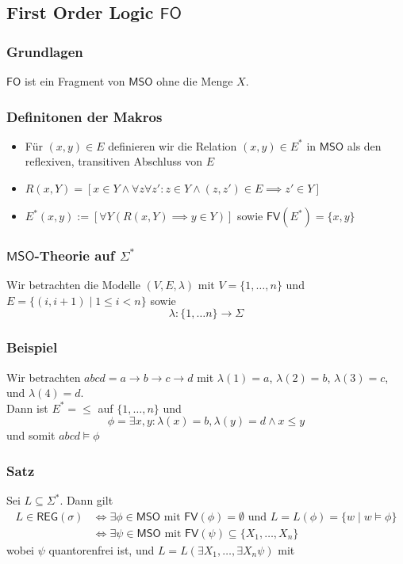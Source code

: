 \documentclass[12pt, german]{article}
\newcommand{\sigstern}{\Sigma^\ast}
\newcommand{\east}{E^{\ast}}
\newcommand{\fv}{\mathsf{FV}}
\newcommand{\fo}{\mathsf{FO}}
\newcommand{\mso}{\mathsf{MSO}}
\newcommand{\reg}{\mathsf{REG}}
\begin{document}
\subsection{First Order Logic $\fo$}
\subsubsection{Grundlagen}
	$\fo$ ist ein Fragment von $\mso$ ohne die Menge $X$.
	
\subsubsection{Definitonen der Makros}
	\begin{itemize}
		\item  Für $(x,y) \in E$ definieren wir die Relation $(x,y) \in \east$  in $\mso$ als den reflexiven, transitiven Abschluss von $E$
		\item $R(x,Y) = [x \in Y \land \forall z \forall z': z \in Y \land (z,z') \in E \implies z' \in Y]$
		\item $\east(x,y) := [\forall Y (R(x,Y) \implies y \in Y)]$ sowie $\fv(\east) = \{x,y\}$
	\end{itemize}

\subsubsection{$\mso$-Theorie auf $\sigstern$}
	Wir betrachten die Modelle $(V,E,\lambda)$ mit $V= \{1, \ldots, n\}$ und $E=\{(i, i+1) \mid 1 \leq i < n\}$ sowie $$\lambda: \{1, \ldots n\} \to \Sigma$$

\subsubsection{Beispiel}
	Wir betrachten $abcd = a \to b \to c \to d$ mit $\lambda(1) = a$, $\lambda(2) = b$, $\lambda(3) = c$,  und $\lambda(4) = d$. \\ 
	Dann ist $\east = \leq$ auf $\{1, \ldots, n\}$ und $$\phi = \exists x,y: \lambda(x) = b, \lambda(y) = d \land x \leq y$$ und somit $abcd \models \phi$

\subsubsection{Satz}
	Sei $L \subseteq \sigstern$. Dann gilt 
	\begin{align*}
	L \in \reg(\sigma) &\iff \exists \phi \in \mso \text{ mit } \fv(\phi) = \emptyset \text{ und } L=L(\phi) = \{w \mid w \models \phi \}\\
	&\iff \exists \psi \in \mso  \text{ mit } \fv(\psi) \subseteq \{X_1, \ldots, X_n\} 
	\end{align*}
 wobei $\psi$ quantorenfrei ist, und  $L= L(\exists X_1, \ldots, \exists X_n \psi) $
mit 
\end{document}
